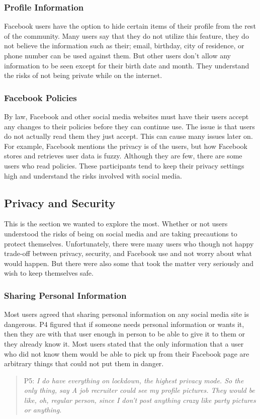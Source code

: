 \subsubsection{Profile Information}
Facebook users have the option to hide certain items of their profile from the rest of the community. Many users say that they do not utilize this feature, they do not believe the information such as their; email, birthday, city of residence, or phone number can be used against them. But other users don't allow any information to be seen except for their birth date and month. They understand the risks of not being private while on the internet.
\subsubsection{Facebook Policies}
By law, Facebook and other social media websites must have their users accept any changes to their policies before they can continue use. The issue is that users do not actually read them they just accept. This can cause many issues later on. For example, Facebook mentions the privacy is of the users, but how Facebook stores and retrieves user data is fuzzy. Although they are few, there are some users who read policies. These participants tend to keep their privacy settings high and understand the risks involved with social media.
\subsection{Privacy and Security}
This is the section we wanted to explore the most. Whether or not users understood the risks of being on social media and are taking precautions to protect themselves. Unfortunately, there were many users who though not happy trade-off between privacy, security, and Facebook use and not worry about what would happen. But there were also some that took the matter very seriously and wish to keep themselves safe.
\subsubsection{Sharing Personal Information}
Most users agreed that sharing personal information on any social media site is dangerous. P4 figured that if someone needs personal information or wants it, then they are with that user enough in person to be able to give it to them or they already know it. Most users stated that the only information that a user who did not know them would be able to pick up from their Facebook page are arbitrary things that could not put them in danger.
\begin{quote}
P5: \textit{I do have everything on lockdown, the highest privacy mode. So the only thing, say A job recruiter could see my profile pictures. They would be like, oh, regular person, since I don't post anything crazy like party pictures or anything.}
\end{quote}
